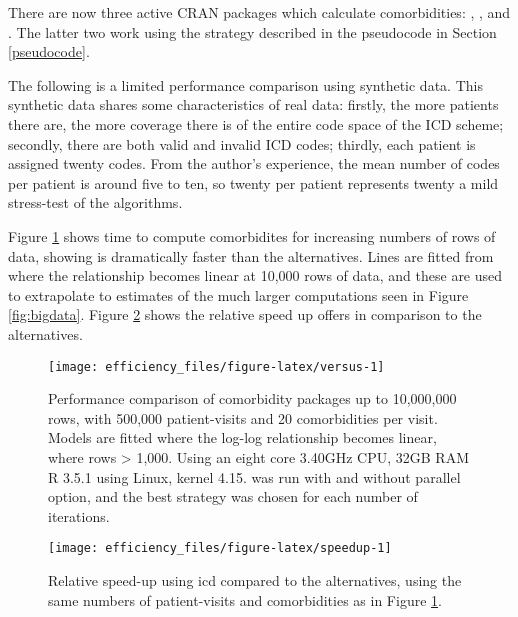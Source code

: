 \documentclass[article]{jss}
\begin{document}
There are now three active CRAN packages which calculate comorbidities:
,  \citep{medicalriskpkg}, and
 \citep{comorbiditypkg}. The latter two work using the
strategy described in the pseudocode in Section \ref{pseudocode}.

The following is a limited performance comparison using synthetic data.
This synthetic data shares some characteristics of real data: firstly,
the more patients there are, the more coverage there is of the entire
code space of the ICD scheme; secondly, there are both valid and invalid
ICD codes; thirdly, each patient is assigned twenty codes. From the
author's experience, the mean number of codes per patient is around five
to ten, so twenty per patient represents twenty a mild stress-test of
the algorithms.

Figure \ref{fig:versus} shows time to compute comorbidites for
increasing numbers of rows of data, showing  is dramatically
faster than the alternatives. Lines are fitted from where the
relationship becomes linear at 10,000 rows of data, and these are used
to extrapolate to estimates of the much larger computations seen in
Figure \ref{fig:bigdata}. Figure \ref{fig:speedup} shows the relative
speed up  offers in comparison to the alternatives.

\begin{CodeChunk}
\begin{figure}

{\centering \texttt{[image: efficiency\_files/figure-latex/versus-1]} 

}

\caption[Performance comparison of comorbidity packages up to 10,000,000 rows, with 500,000 patient-visits and 20 comorbidities per visit]{Performance comparison of comorbidity packages up to 10,000,000 rows, with 500,000 patient-visits and 20 comorbidities per visit. Models are fitted where the log-log relationship becomes linear, where rows > 1,000. Using an eight core 3.40GHz CPU, 32GB RAM R 3.5.1 using Linux, kernel 4.15.  was run with and without parallel option, and the best strategy was chosen for each number of iterations.}\label{fig:versus}
\end{figure}
\end{CodeChunk}

\begin{CodeChunk}
\begin{figure}

{\centering \texttt{[image: efficiency\_files/figure-latex/speedup-1]} 

}

\caption{Relative speed-up using icd compared to the alternatives, using the same numbers of patient-visits and comorbidities as in Figure \ref{fig:versus}.}\label{fig:speedup}
\end{figure}
\end{CodeChunk}
\end{document}
